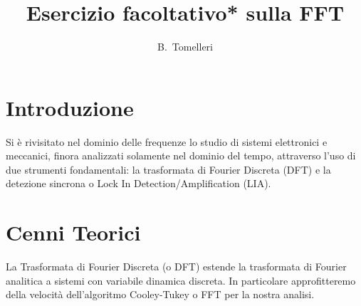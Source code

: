 \documentclass{article}[a4paper, oneside, 11pt]
\title{Esercizio facoltativo* sulla FFT}
\author{B.~Tomelleri \thanksdf}
\begin{document}
\maketitle

\section{Introduzione}
Si è rivisitato nel dominio delle frequenze lo studio di sistemi elettronici
e meccanici, finora analizzati solamente nel dominio del tempo, attraverso l'uso
di due strumenti fondamentali: la trasformata di Fourier Discreta (DFT) e la
detezione sincrona o Lock In Detection/Amplification (LIA).

\section{Cenni Teorici}
La Trasformata di Fourier Discreta (o DFT) estende la trasformata di Fourier
analitica a sistemi con variabile dinamica discreta. In particolare
approfitteremo della velocità dell'algoritmo Cooley-Tukey \cite{FFT} o FFT
per la nostra analisi.
\end{document}

